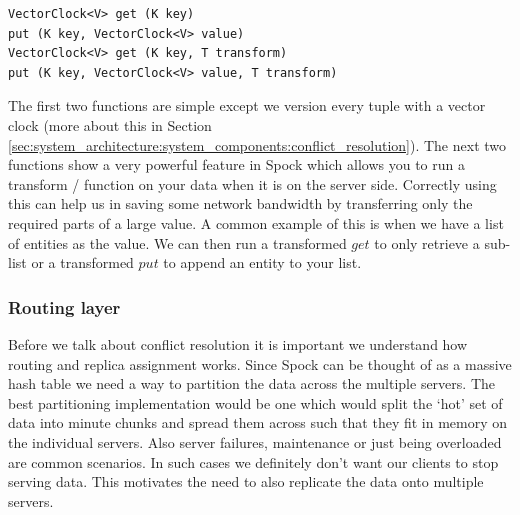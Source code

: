 \documentclass[twocolumn]{article}
\newcommand{\projectname}{Spock}
\begin{document}
\scriptsize
\begin{verbatim}
VectorClock<V> get (K key)
put (K key, VectorClock<V> value)
VectorClock<V> get (K key, T transform)
put (K key, VectorClock<V> value, T transform)
\end{verbatim}
\normalsize

The first two functions are simple except we version every tuple with a vector clock (more about this in Section \ref{sec:system_architecture:system_components:conflict_resolution}). The next two functions show a very powerful feature in \projectname{} which allows you to run a transform / function on your data when it is on the server side. Correctly using this can help us in saving some network bandwidth by transferring only the required parts of a large value. A common example of this is when we have a list of entities as the value. We can then run a transformed $get$ to only retrieve a sub-list or a transformed $put$ to append an entity to your list. 


\subsubsection {Routing layer }  
\label{sec:system_architecture:system_components:routing_layer}

Before we talk about conflict resolution it is important we understand how routing and replica assignment works. Since \projectname{} can be thought of as a massive hash table we need a way to partition the data across the multiple servers. The best partitioning implementation would be one which would split the `hot' set of data into minute chunks and spread them across such that they fit in memory on the individual servers. Also server failures, maintenance or just being overloaded are common scenarios. In such cases we definitely don't want our clients to stop serving data. This motivates the need to also replicate the data onto multiple servers. 
\end{document}
